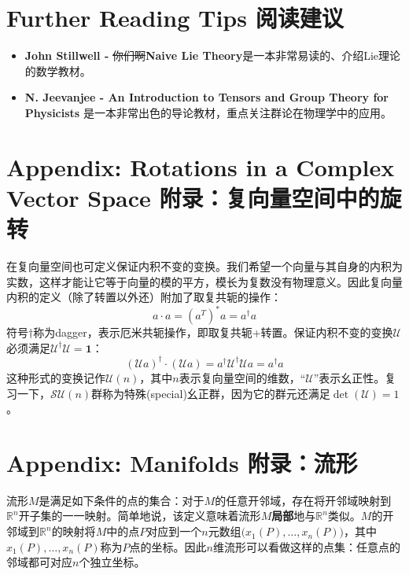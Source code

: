 \section*{Further Reading Tips \quad 阅读建议}
\begin{itemize}
    \item  {\bf John Stillwell -} \sout{你们啊}{\bf Naive Lie Theory}是一本非常易读的、介绍Lie理论的数学教材。
    \item {\bf N. Jeevanjee - An Introduction to Tensors and Group Theory for Physicists}
是一本非常出色的导论教材，重点关注群论在物理学中的应用。
\end{itemize}

\section[附录：复向量空间中的旋转]{Appendix: Rotations in a Complex Vector Space \quad 附录：复向量空间中的旋转}
\label{sec3.10}
在复向量空间也可定义保证内积不变的变换。我们希望一个向量与其自身的内积为实数，这样才能让它等于向量的模的平方，模长为复数没有物理意义。因此复向量内积的定义（除了转置以外还）附加了取复共轭的操作：
\begin{equation}
\label{sec3.260}
    a \cdot a = (a^T)^* a = a^\dag a
\end{equation}
符号$\dag$称为dagger，表示厄米共轭操作，即取复共轭+转置。保证内积不变的变换$\mathcal{U}$必须满足$\mathcal{U}^\dag \mathcal{U} = \mathbf{1}$：
\begin{equation}
\label{equ3.261}
    (\mathcal{U} a)^\dag \cdot (\mathcal{U} a) = a^\dag \mathcal{U}^\dag \mathcal{U} a = a^\dag a
\end{equation}
这种形式的变换记作$\mathcal{U} (n)$，其中$n$表示复向量空间的维数，``$\mathcal{U}$''表示幺正性。复习一下，$\mathcal{SU}(n)$群称为特殊(special)幺正群，因为它的群元还满足$\det (\mathcal{U}) = 1$。

\section[附录：流形]{Appendix: Manifolds \quad 附录：流形}
\label{sec3.11}
流形$M$是满足如下条件的点的集合：对于$M$的任意开邻域，存在将开邻域映射到$\mathbb{R}^n$开子集的一一映射。简单地说，该定义意味着流形$M${\bf 局部}地与$\mathbb{R}^n$类似。$M$的开邻域到$\mathbb{R}^n$的映射将$M$中的点$P$对应到一个$n$元数组$\big( x_1(P), \dots, x_n(P) \big)$，其中$x_1(P), \dots, x_n(P)$称为$P$点的坐标。因此$n$维流形可以看做这样的点集：任意点的邻域都可对应$n$个独立坐标。

